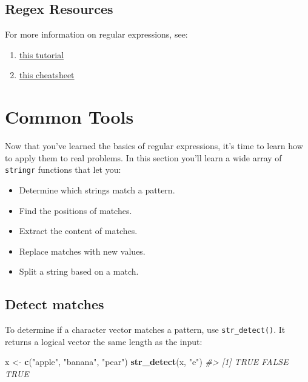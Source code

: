 \documentclass[]{book}
\newenvironment{Shaded}{\begin{snugshade}}{\end{snugshade}}
\newcommand{\KeywordTok}[1]{\textcolor[rgb]{0.13,0.29,0.53}{\textbf{#1}}}
\newcommand{\StringTok}[1]{\textcolor[rgb]{0.31,0.60,0.02}{#1}}
\newcommand{\CommentTok}[1]{\textcolor[rgb]{0.56,0.35,0.01}{\textit{#1}}}
\newcommand{\NormalTok}[1]{#1}
\providecommand{\tightlist}{%
  \setlength{\itemsep}{0pt}\setlength{\parskip}{0pt}}
\begin{document}
\subsection{Regex Resources}\label{regex-resources}

For more information on regular expressions, see:

\begin{enumerate}
\def\labelenumi{\arabic{enumi}.}
\tightlist
\item
  \href{http://regextutorials.com/}{this tutorial}
\item
  \href{https://medium.com/factory-mind/regex-tutorial-a-simple-cheatsheet-by-examples-649dc1c3f285}{this
  cheatsheet}
\end{enumerate}

\hypertarget{common-tools}{\section{Common Tools}\label{common-tools}}

Now that you've learned the basics of regular expressions, it's time to
learn how to apply them to real problems. In this section you'll learn a
wide array of \texttt{stringr} functions that let you:

\begin{itemize}
\tightlist
\item
  Determine which strings match a pattern.
\item
  Find the positions of matches.
\item
  Extract the content of matches.
\item
  Replace matches with new values.
\item
  Split a string based on a match.
\end{itemize}

\subsection{Detect matches}\label{detect-matches}

To determine if a character vector matches a pattern, use
\texttt{str\_detect()}. It returns a logical vector the same length as
the input:

\begin{Shaded}
\begin{Highlighting}[]
\NormalTok{x <-}\StringTok{ }\KeywordTok{c}\NormalTok{(}\StringTok{"apple"}\NormalTok{, }\StringTok{"banana"}\NormalTok{, }\StringTok{"pear"}\NormalTok{)}
\KeywordTok{str_detect}\NormalTok{(x, }\StringTok{"e"}\NormalTok{)}
\CommentTok{#> [1]  TRUE FALSE  TRUE}
\end{Highlighting}
\end{Shaded}
\end{document}
